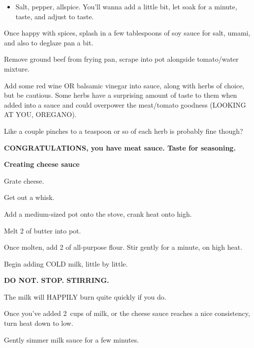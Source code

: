 \begin{recipe}
{\begin{itemize}
			\item Salt, pepper, allspice. You’ll wanna add a little bit, let soak for a minute, taste, and adjust to taste.
		\end{itemize}


		\step Once happy with spices, splash in a few tablespoons of soy sauce for salt, umami, and also to deglaze pan a bit.

		\step Remove ground beef from frying pan, scrape into pot alongside tomato/water mixture.

		\step Add some red wine OR balsamic vinegar into sauce, along with herbs of choice, but be cautious. Some herbs have a surprising amount of taste to them when added into a sauce and could overpower the meat/tomato goodness (LOOKING AT YOU, OREGANO).

		Like a couple pinches to a teaspoon or so of each herb is probably fine though?

		\textbf{\large CONGRATULATIONS, you have meat sauce. Taste for seasoning.}

		\textbf{\large Creating cheese sauce}

		\step Grate cheese.

		\vspace{1em}

		\step Get out a whisk.

		\vspace{1em}

		\step Add a medium-sized pot onto the stove, crank heat onto high.

		\vspace{1em}

		\step Melt \SI{2}{\tablespoon} of butter into pot.

		\vspace{1em}

		\step Once molten, add \SI{2}{\tablespoon} of all-purpose flour. Stir gently for a minute, on high heat.

		\step Begin adding COLD milk, little by little.

		\vspace{1em}

		\textbf{\Huge DO NOT. STOP. STIRRING.}

		The milk will HAPPILY burn quite quickly if you do.

		\step Once you’ve added \SI{2}{cups} of milk, or the cheese sauce reaches a nice consistency, turn heat down to low.

		\step Gently simmer milk sauce for a few minutes.

}
\end{recipe}
